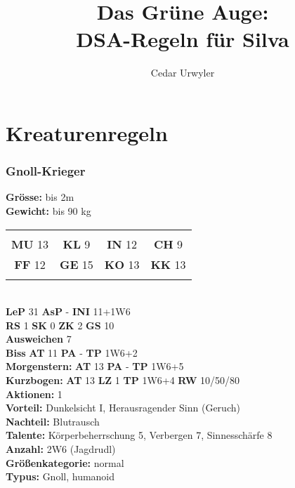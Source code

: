\documentclass[9pt]{article}
\author{Cedar Urwyler}
\title{Das Grüne Auge:\\DSA-Regeln für Silva}
\begin{document}
\maketitle
\tableofcontents

\section{Kreaturenregeln}
\begin{multicols}{2}

\begin{shaded*}
	\subsubsection{Gnoll-Krieger}
	\textbf{Grösse:} bis 2m\\
	\textbf{Gewicht:} bis 90 kg\\
	\begin{tabular}{cccc}
		&&&\\
		\textbf{MU} 13 & \textbf{KL} 9 & \textbf{IN} 12 & \textbf{CH} 9 \\ 
		\textbf{FF} 12 & \textbf{GE} 15 & \textbf{KO} 13 & \textbf{KK} 13 \\
		&&&\\
	\end{tabular}
	\\
	\textbf{LeP} 31 \textbf{AsP} -	\textbf{INI} 11+1W6 \\
	\textbf{RS} 1 	\textbf{SK} 0	\textbf{ZK} 2 		\textbf{GS} 10 \\
	\textbf{Ausweichen} 7 \\
	\textbf{Biss} \textbf{AT} 11 \textbf{PA} - \textbf{TP} 1W6+2\\
	\textbf{Morgenstern:} \textbf{AT} 13 \textbf{PA} - \textbf{TP} 1W6+5\\
	\textbf{Kurzbogen:} \textbf{AT} 13 \textbf{LZ} 1 \textbf{TP} 1W6+4 \textbf{RW} 10/50/80\\
	\textbf{Aktionen:} 1 \\
	\textbf{Vorteil:} Dunkelsicht I, Herausragender Sinn (Geruch) \\
	\textbf{Nachteil:} Blutrausch\\
	\textbf{Talente:}
	Körperbeherrschung 5,
	Verbergen 7,
	Sinnesschärfe 8
	\\
	\textbf{Anzahl:} 2W6 (Jagdrudl) \\
	\textbf{Größenkategorie:} normal \\
	\textbf{Typus:} Gnoll, humanoid \\
	

\end{shaded*}
\end{multicols}
\end{document}
